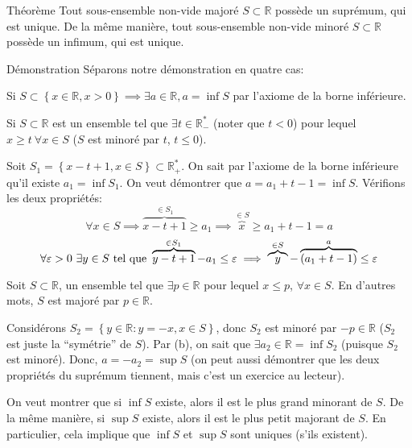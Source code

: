 \documentclass{article}
\begin{document}
\begin{parag}{Théorème}
    Tout sous-ensemble non-vide majoré $S \subset \mathbb{R}$ possède un suprémum, qui est unique. De la même manière, tout sous-ensemble non-vide minoré $S \subset \mathbb{R}$ possède un infimum, qui est unique.

    \begin{subparag}{Démonstration}
        Séparons notre démonstration en quatre cas:

        \vspace{1em}
         Si $S \subset \left\{x \in \mathbb{R}, x > 0\right\} \implies \exists a \in \mathbb{R}, a = \inf S$ par l'axiome de la borne inférieure.

        \vspace{1em}
         Si $S \subset \mathbb{R}$ est un ensemble tel que $\exists t \in \mathbb{R}^*_-$ (noter que $t < 0$) pour lequel $x \geq t \ \forall x \in S$ ($S$ est minoré par $t$, $t \leq 0$).


        Soit $S_1 = \left\{x - t + 1, x \in S\right\} \subset \mathbb{R}^*_+$. On sait par l'axiome de la borne inférieure qu'il existe $a_1 = \inf S_1$. On veut démontrer que $a = a_1 + t - 1 = \inf S$. Vérifions les deux propriétés:
        \[\forall x \in S \implies \overbrace{x - t + 1}^{\in S_1} \geq a_1 \implies \overbrace{x}^{\in S} \geq a_1 + t - 1 = a\]
        \[\forall \epsilon > 0 \ \exists y \in S \telque \overbrace{y - t + 1}^{\in S_1} - a_1 \leq \epsilon \implies \overbrace{y}^{\in S} - \overbrace{\left(a_1 + t - 1\right)}^{a} \leq \epsilon\]

        \vspace{1em}
         Soit $S \subset \mathbb{R}$, un ensemble tel que $\exists p \in \mathbb{R}$ pour lequel $x \leq p$, $\forall x \in S$. En d'autres mots, $S$ est majoré par $p \in \mathbb{R}$.

        Considérons $S_2 = \left\{y \in \mathbb{R} : y = -x, x \in S\right\}$, donc $S_2$ est minoré par $-p \in \mathbb{R}$ ($S_2$ est juste la ``symétrie'' de $S$). Par (b), on sait que $\exists a_2 \in \mathbb{R} = \inf S_2$ (puisque $S_2$ est minoré). Donc, $a = -a_2 = \sup S$ (on peut aussi démontrer que les deux propriétés du suprémum tiennent, mais c'est un exercice au lecteur).

        \vspace{1em}
         On veut montrer que si $\inf S$ existe, alors il est le plus grand minorant de $S$. De la même manière, si $\sup S$ existe, alors il est le plus petit majorant de $S$. En particulier, cela implique que $\inf S$ et $\sup S$ sont uniques (s'ils existent).


\end{subparag}
\end{parag}
\end{document}

